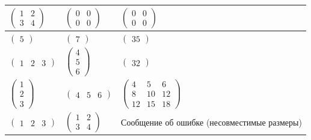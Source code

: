\begin{table}[h]
\begin{threeparttable}
\begin{tabular}{|p{}|p{}|p{}|}
			$\begin{pmatrix}
				1 & 2 \\
				3 & 4
			\end{pmatrix}$ &
			$\begin{pmatrix}
				0 & 0 \\
				0 & 0
			\end{pmatrix}$ &
			$\begin{pmatrix}
				0 & 0 \\
				0 & 0
			\end{pmatrix}$ \\
			\hline
			
			$\begin{pmatrix}
				5
			\end{pmatrix}$ &
			$\begin{pmatrix}
				7
			\end{pmatrix}$ &
			$\begin{pmatrix}
				35
			\end{pmatrix}$ \\
			\hline
			
			$\begin{pmatrix}
				1 & 2 & 3
			\end{pmatrix}$ &
			$\begin{pmatrix}
				4 \\
				5 \\
				6
			\end{pmatrix}$ &
			$\begin{pmatrix}
				32
			\end{pmatrix}$ \\
			\hline
			
			$\begin{pmatrix}
				1 \\
				2 \\
				3
			\end{pmatrix}$ &
			$\begin{pmatrix}
				4 & 5 & 6
			\end{pmatrix}$ &
			$\begin{pmatrix}
				4 & 5 & 6 \\
				8 & 10 & 12 \\
				12 & 15 & 18
			\end{pmatrix}$ \\
			\hline
			
			$\begin{pmatrix}
				1 & 2 & 3
			\end{pmatrix}$ &
			$\begin{pmatrix}
				1 & 2 \\
				3 & 4
			\end{pmatrix}$ &
			Сообщение об ошибке (несовместимые размеры) \\
			\hline
		\end{tabular}
	\end{threeparttable}
\end{table}

